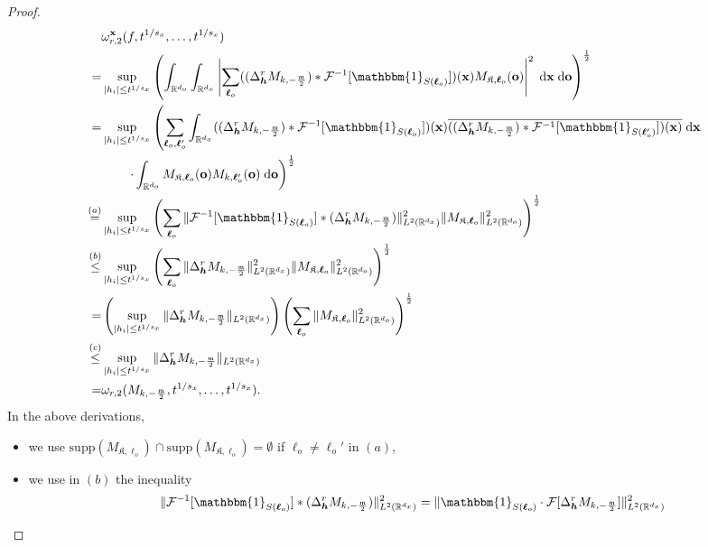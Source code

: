 \documentclass[11pt]{article}
\newcommand{\one}{\mathbbm{1}}
\newcommand{\bx}{\mathbf x}
\newcommand{\bo}{\mathbf o}
\newcommand{\calF}{\mathcal{F}}
\newcommand{\bl}{{\boldsymbol\ell}}
\newcommand{\0}{\mathbf{0}}
\newcommand{\bh}{\boldsymbol{h}}
\begin{document}
\begin{appendix}
\begin{proof}
\begin{align*}
    &\omega^{\bx}_{r,2}(f, t^{1/s_x},\dots, t^{1/s_x})\\
    =&\sup_{|h_i|\leq t^{1/s_x}}\left(\int_{\mathbb{R}^{d_o}}\int_{\mathbb{R}^{d_x}} \left|\sum_{\bl_o} ( (\Delta_{\bh}^r M_{k,-\frac{\mathfrak{m}}{2}}) \ast \calF^{-1}[\one_{S(\bl_o)}])(\bx) M_{\mathfrak{K},\bl_o}(\bo)\right|^2 \;\mathrm{d}\bx\;\mathrm{d}\bo\right)^{\frac{1}{2}}\\
    =&\sup_{|h_i|\leq t^{1/s_x}}\left(\sum_{\bl_o,\bl_o'}\int_{\mathbb{R}^{d_x}} ( (\Delta_{\bh}^r M_{k,-\frac{\mathfrak{m}}{2}}) \ast \calF^{-1}[\one_{S(\bl_o)}])(\bx) \overline{( (\Delta_{\bh}^r M_{k,-\frac{\mathfrak{m}}{2}}) \ast \calF^{-1}[\one_{S(\bl_o')}])(\bx)} \;\mathrm{d}\bx  \right. \\
    &\qquad \left. \cdot \int_{\mathbb{R}^{d_o}}M_{\mathfrak{K},\bl_o}(\bo) M_{k,\bl_o'}(\bo) \;\mathrm{d}\bo\right)^{\frac{1}{2}}\\
    \stackrel{(a)}{=}&\sup_{|h_i|\leq t^{1/s_x}}\left(\sum_{\bl_o}\|\calF^{-1}[\one_{S(\bl_o)}]\ast (\Delta^r_{\bh}M_{k,-\frac{\mathfrak{m}}{2}})\|_{L^2(\mathbb{R}^{d_x})}^2 \|M_{\mathfrak{K},\bl_o}\|_{L^2(\mathbb{R}^{d_o})}^2\right)^{\frac{1}{2}}\\
    \stackrel{(b)}{\leq}& \sup_{|h_i|\leq t^{1/s_x}}\left(\sum_{\bl_o}\|\Delta^r_{\bh}M_{k,-\frac{\mathfrak{m}}{2}}\|_{L^2(\mathbb{R}^{d_x})}^2 \|M_{\mathfrak{K},\bl_o}\|_{L^2(\mathbb{R}^{d_o})}^2\right)^{\frac{1}{2}}\\
    =& \left(\sup_{|h_i|\leq t^{1/s_x}}\|\Delta^r_{\bh}M_{k,-\frac{\mathfrak{m}}{2}}\|_{L^2(\mathbb{R}^{d_x})}\right)\left(\sum_{\bl_o}\|M_{\mathfrak{K},\bl_o}\|_{L^2(\mathbb{R}^{d_o})}^2\right)^{\frac{1}{2}}\\
    \stackrel{(c)}{\leq} & \sup_{|h_i|\leq t^{1/s_x}}\|\Delta^r_{\bh}M_{k,-\frac{\mathfrak{m}}{2}}\|_{L^2(\mathbb{R}^{d_x})}\\
    =& \omega_{r,2}(M_{k,-\frac{\mathfrak{m}}{2}},t^{1/s_x},\dots,t^{1/s_x}).
\end{align*}
In the above derivations,
\begin{itemize}
    \item we use $\mathrm{supp}(M_{\mathfrak{K},\bl_o})\cap \mathrm{supp}(M_{\mathfrak{K},\bl_o}) = \emptyset$ if $\bl_o\neq \bl_o'$ in $(a)$,
    \item we use in $(b)$ the inequality 
\begin{align}
\begin{aligned}
\label{eq:plancherel_indicator_inequality}
    &\quad \|\calF^{-1}[\one_{S(\bl_o)}] \ast (\Delta^r_{\bh}M_{k,-\frac{\mathfrak{m}}{2}})\|^2_{L^2(\mathbb{R}^{d_x})} = \|\one_{S(\bl_o)} \cdot \calF[\Delta^r_{\bh}M_{k,-\frac{\mathfrak{m}}{2}}]\|^2_{L^2(\mathbb{R}^{d_x})} \\

\end{aligned}
\end{align}
\end{itemize}
\end{proof}
\end{appendix}
\end{document}

